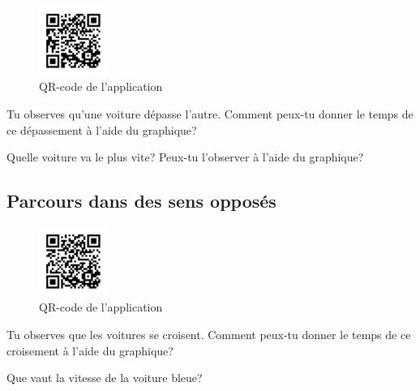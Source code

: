 \documentclass[
  letterpaper,
  DIV=11,
  numbers=noendperiod]{scrartcl}
\theoremstyle{definition}
\theoremstyle{definition}
\theoremstyle{remark}
\begin{document}
\begin{figure}[H]

{\centering \includegraphics[width=0.2\textwidth,height=\textheight]{figures/mru/mru-2.pdf}

}

\caption{QR-code de l'application}

\end{figure}%

Tu observes qu'une voiture dépasse l'autre. Comment peux-tu donner le
temps de ce dépassement à l'aide du graphique?

\vspace{3cm}

Quelle voiture va le plus vite? Peux-tu l'observer à l'aide du
graphique?

\vspace{3cm}

\subsection{Parcours dans des sens
opposés}\label{parcours-dans-des-sens-opposuxe9s}

\begin{figure}[H]

{\centering \includegraphics[width=0.2\textwidth,height=\textheight]{figures/mru/mru-3.pdf}

}

\caption{QR-code de l'application}

\end{figure}%

Tu observes que les voitures se croisent. Comment peux-tu donner le
temps de ce croisement à l'aide du graphique? \vspace{3cm}

Que vaut la vitesse de la voiture bleue?

\vspace{3cm}
\end{document}
